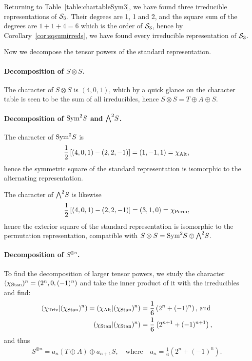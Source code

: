 \begin{example}
	Returning to Table~\ref{table:chartableSym3}, we have found three irreducible representations of $\mathcal{S}_3$. Their degrees are 1, 1 and 2, and the square sum of the degrees are $1 + 1 + 4 = 6$ which is the order of $\mathcal{S}_3$, hence by Corollary~\ref{cor:sqsumirreds}, we have found every irreducible representation of $\mathcal{S}_3$. 
	
	Now we decompose the tensor powers of the standard representation.
	
	\paragraph{Decomposition of $S \otimes S$.} The character of $S \otimes S$ is $(4,0,1)$, which by a quick glance on the character table is seen to be the sum of all irreducibles, hence $S \otimes S = T \oplus A \oplus S$.
	
	\paragraph{Decomposition of $\text{Sym}^2S$ and ${\bigwedge}^2S$.} The character of $\text{Sym}^2S$ is 
	\begin{align*}
		\frac{1}{2}\left[ (4,0,1) - (2,2,-1) \right] = (1,-1,1) = \chi_{\text{Alt}},
	\end{align*} hence the symmetric square of the standard representation is isomorphic to the alternating representation. 
	
	The character of ${\bigwedge}^2S$ is likewise 
	\begin{align*}
		\frac{1}{2}\left[ (4,0,1) - (2,2,-1) \right] = (3,1,0) = \chi_{\text{Perm}}, 
	\end{align*}
	hence the exterior square of the standard representation is isomorphic to the permutation representation, compatible with $S \otimes S = \text{Sym}^2S \oplus {\bigwedge}^2S$.
	
	\paragraph{Decomposition of $S^{\otimes n}$.}\cite[Exercise 2.7.]{FultonHarris} To find the decomposition of larger tensor powers, we study the character $(\chi_{\text{Stan}})^n = (2^n, 0, (-1)^n)$ and take the inner product of it with the irreducibles and find:
	\begin{align*}
		({\chi_{\text{Triv}}}|(\chi_{\text{Stan}})^n) = ({\chi_{\text{Alt}}}|(\chi_{\text{Stan}})^n) &= \frac{1}{6}\left(2^n + (-1)^n\right) \text{, and}\\
		({\chi_{\text{Stan}}}|(\chi_{\text{Stan}})^n) &= \frac{1}{6}\left(2^{n+1} + (-1)^{n+1}\right), 
	\end{align*}
	and thus \begin{align*}
		S^{\otimes n} = a_n (T \oplus A) \oplus a_{n+1} S, \quad \text{where} \quad a_n = \frac{1}{6}\left(2^n + (-1)^n\right).
	\end{align*} 
\end{example}


